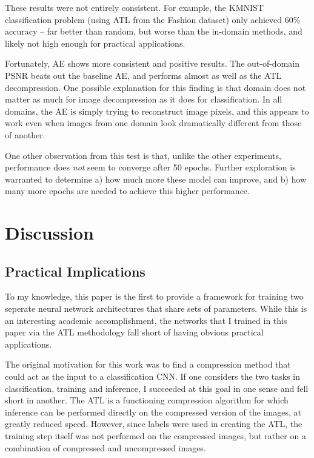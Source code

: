 \documentclass[twoside,11pt]{article}
\begin{document}
These results were not entirely consistent. For example, the KMNIST classification problem
(using ATL from the Fashion dataset) only achieved 60\% accuracy -- far better than random,
but worse than the in-domain methods, and likely not high enough for practical
applications.

Fortunately, AE shows more consistent and positive results.
The out-of-domain PSNR beats out the baseline
AE, and performs almost as well as the ATL decompression. 
One possible explanation for this finding is that
domain does not matter as much for image decompression as it does for classification. In all
domains, the AE is simply trying to reconstruct image pixels, and this appears to work even 
when images from one domain look dramatically different from those of another.

One other observation from this test is that, unlike the other experiments, performance does \emph{not}
seem to converge after 50 epochs. Further exploration is warranted to determine a)
how much more these model can improve, and b) how many more epochs are needed to achieve
this higher performance.








\section{Discussion}

\subsection{Practical Implications}

To my knowledge, this paper is the first to provide a framework for training two 
seperate neural network architectures that share sets of parameters. 
While this is an interesting academic accomplishment, the networks that I trained 
in this paper via the ATL methodology fall short of having obvious practical applications.

The original motivation for this work was to find a compression method that could act as
the input to a classification CNN. If one considers the two tasks in classification,
training and inference, I succeeded at this goal in one sense and fell short in another. 
The ATL is a functioning compression algorithm for which inference can be performed directly
on the compressed version of the images, at greatly reduced speed. However, since labels
were used in creating the ATL, the training step itself was not performed on the compressed 
images, but rather on a combination of compressed and uncompressed images. 
\end{document}
